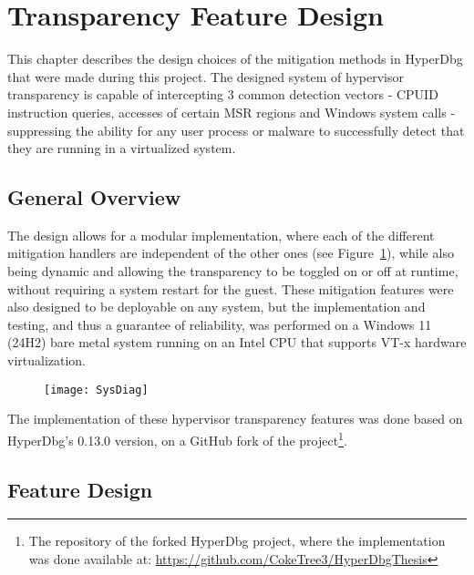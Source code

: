 \section{Transparency Feature Design}\label{s:design}

This chapter describes the design choices of the mitigation methods in HyperDbg that were made during this project. The designed system of hypervisor transparency is capable of intercepting 3 common detection vectors - CPUID instruction queries, accesses of certain MSR regions and Windows system calls - 
suppressing the ability for any user process or malware to successfully detect that they are running in a virtualized system.

\subsection{General Overview}
The design allows for a modular implementation, where each of the different mitigation handlers are independent of the other ones (see Figure~\ref{fig:feature_diagram}), 
while also being dynamic and allowing the transparency to be toggled on or off at runtime, without requiring a system restart for the guest.
These mitigation features were also designed to be deployable on any system, but the implementation and testing, and thus a guarantee of reliability, 
was performed on a Windows 11 (24H2) bare metal system running on an Intel CPU that supports VT-x hardware virtualization. 

\begin{figure}[tbh]
    \texttt{[image: SysDiag]}
    \label{fig:feature_diagram}
\end{figure}

The implementation of these hypervisor transparency features was done based on HyperDbg's 0.13.0 version, on a GitHub fork of the 
project\footnote{The repository of the forked HyperDbg project, where the implementation was done available at: \url{https://github.com/CokeTree3/HyperDbgThesis}}.


\subsection{Feature Design}
